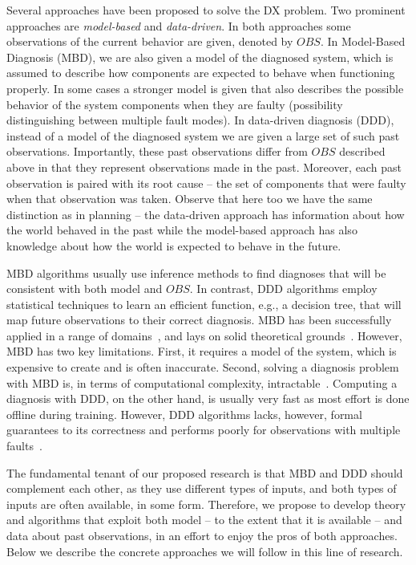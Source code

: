 \documentclass[12pt]{article}
\begin{document}
Several approaches have been proposed to solve the DX problem. Two prominent approaches are {\em model-based} and {\em data-driven}. In both approaches some observations of the current behavior are given, denoted by $OBS$. In Model-Based Diagnosis (MBD), we are also given a model of the diagnosed system, which is assumed to describe how  components are expected to behave when functioning properly. In some cases a stronger model is given that also describes the possible behavior of the system components when they are faulty (possibility distinguishing between multiple fault modes). In data-driven diagnosis (DDD), instead of a model of the diagnosed system we are given a large set of such past observations. Importantly, these past observations differ from $OBS$ described above in that they represent observations made in the past. Moreover, each past observation is paired with its root cause -- the set of components that were faulty when that observation was taken. Observe that here too we have the same distinction as in planning -- the data-driven approach has information about how the world behaved in the past while the model-based approach has also knowledge about how the world is expected to behave in the future. 


MBD algorithms usually use inference methods to find diagnoses that will be consistent with both model and $OBS$. In contrast, DDD algorithms employ statistical techniques to learn an efficient function, e.g., a decision tree, that will map future observations to their correct diagnosis. 
MBD has been successfully applied in a range of domains~\cite{williams96,struss2003model,wotawa2002model}, and lays on solid theoretical grounds~\cite{deKleer1987diagnosing,reiter1987theory}. However, MBD has two key limitations. First, it requires a model of the system, which is expensive to create and is often inaccurate. Second, solving a diagnosis problem with MBD is, in terms of computational complexity, intractable~\cite{bylander1991computational}. Computing a diagnosis with DDD, on the other hand, is usually very fast as most effort is done offline during training. However, DDD algorithms lacks, however, formal guarantees to its correctness and performs poorly for observations with multiple faults~\cite{keren2011model}. 



The fundamental tenant of our proposed research is that MBD and DDD should complement each other, as they use different types of inputs, and both types of inputs are often available, in some form. Therefore, we propose to develop theory and algorithms that exploit both model -- to the extent that it is available -- and data about past observations, in an effort to enjoy the pros of both approaches. Below we describe the concrete approaches we will follow in this line of research.
\end{document}
